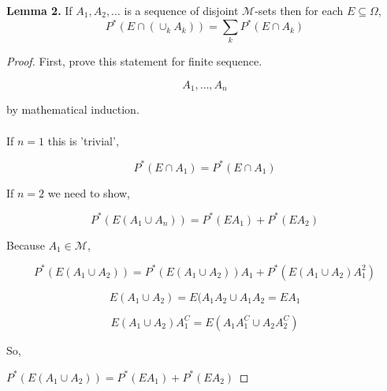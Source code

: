 \documentclass[11pt,fleqn]{book} %
\begin{document}
\textbf{Lemma 2.} If $A_1, A_2, \dots$ is a sequence of disjoint $\mathscr{M}$-sets then for each $E \subseteq \Omega$, 
$$P^*(E\cap(\cup_k A_k)) = \displaystyle \sum_k P^*(E \cap A_k) $$

\begin{proof}
	First, prove this statement for finite sequence. 

	$$A_1, \dots, A_n $$

	by mathematical induction. \\
	\\

	If $n=1$ this is 'trivial', 

	$$P^*(E\cap A_1) = P^*(E \cap A_1) $$

	If $n = 2$ we need to show, 

	$$ P^*(E  (A_1 \cup A_n)) = P^*(E A_1) + P^*(E A_2)$$

	Because $A_1 \in \mathscr{M}$, 

	$$P^*(E(A_1 \cup A_2)) = P^*(E(A_1 \cup A_2)) A_1 + P^*(E(A_1 \cup A_2)A_1^2)  $$

	$$E(A_1 \cup A_2) = E(A_1 A_2 \cup A_1 A_2 = EA_1$$

	$$E(A_1 \cup A_2) A_1^C = E(A_1 A_1^C \cup A_2 A_2^C)$$

	So, 

	$P^*(E(A_1 \cup A_2)) = P^*(EA_1) + P^*(EA_2)$

\end{proof}







\end{document}
